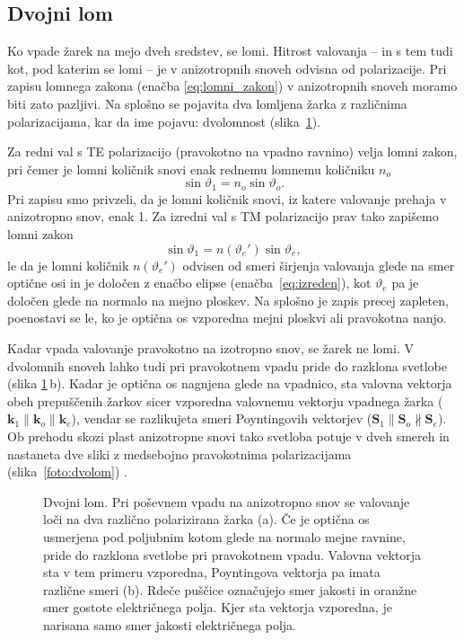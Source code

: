 \subsection*{Dvojni lom}
Ko vpade žarek na mejo dveh sredstev, se lomi. Hitrost valovanja -- in s tem tudi 
kot, pod katerim se lomi -- je v anizotropnih snoveh odvisna od polarizacije.
Pri zapisu lomnega zakona (enačba \ref{eq:lomni_zakon}) 
v anizotropnih snoveh moramo biti zato pazljivi. Na splošno
se pojavita dva lomljena žarka z različnima polarizacijama, kar
da ime pojavu: dvolomnost (slika~\ref{fig:dvolomnost}). 

Za redni val s TE polarizacijo (pravokotno na vpadno ravnino) velja lomni zakon, pri čemer
je lomni količnik snovi enak rednemu lomnemu količniku $n_o$
\begin{equation}
\sin\vartheta_{1}=n_{o}\sin\vartheta_{o}.
\end{equation}
Pri zapisu smo privzeli, da je lomni količnik snovi, iz katere valovanje prehaja v anizotropno snov, 
enak 1. Za izredni val s TM polarizacijo 
prav tako zapišemo lomni zakon
\begin{equation}
\sin\vartheta_{1}=n(\vartheta_e')\sin\vartheta_{e},
\end{equation}
le da je lomni količnik $n(\vartheta_e')$ odvisen od smeri širjenja valovanja glede na smer optične osi
in je določen z enačbo elipse (enačba~\ref{eq:izreden}), kot $\vartheta_e$ pa je določen glede na
normalo na mejno ploskev. Na splošno je zapis precej zapleten, poenostavi se le, 
ko je optična os vzporedna mejni ploskvi ali pravokotna nanjo. 

Kadar vpada valovanje pravokotno na izotropno snov, se žarek ne lomi. V 
dvolomnih snoveh lahko tudi pri pravokotnem vpadu pride do razklona svetlobe (slika
\ref{fig:dvolomnost}\,b). Kadar je optična os nagnjena glede na vpadnico, sta valovna vektorja
obeh prepuščenih žarkov sicer vzporedna valovnemu vektorju vpadnega žarka ($\mathbf{k}_1 \parallel
\mathbf{k}_o \parallel \mathbf{k}_e$), vendar se razlikujeta smeri Poyntingovih vektorjev
($\mathbf{S}_1 \parallel \mathbf{S}_o \nparallel \mathbf{S}_e$). Ob prehodu skozi 
plast anizotropne snovi tako svetloba potuje v dveh smereh in nastaneta dve sliki 
z medsebojno pravokotnima polarizacijama (slika~\ref{foto:dvolom}) . 

\begin{figure}[h]
\centering
\def\svgwidth{140truemm} 

\caption{Dvojni lom. Pri poševnem vpadu na anizotropno snov se
valovanje loči na dva različno polarizirana žarka (a). Če je optična os 
usmerjena pod poljubnim kotom glede na normalo mejne ravnine, pride do razklona svetlobe
pri pravokotnem vpadu. Valovna vektorja sta v tem primeru vzporedna, 
Poyntingova vektorja pa imata različne smeri (b). Rdeče puščice označujejo smer
jakosti in oranžne smer gostote električnega polja. Kjer sta vektorja vzporedna, je narisana
samo smer jakosti električnega polja.}
\label{fig:dvolomnost}
\end{figure}

